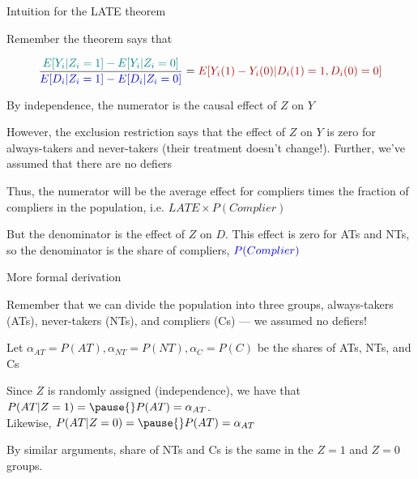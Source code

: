 \documentclass[11pt,english,handout]{beamer}
\newenvironment{wideitemize}{\itemize\addtolength{\itemsep}{10pt}}{\enditemize}
\begin{document}
\begin{frame}{Intuition for the LATE theorem}
\begin{wideitemize}
	\item
	Remember the theorem says that 
	
	$$ \dfrac{ \color{teal} E[Y_i | Z_i = 1] - E[Y_i | Z_i = 0 ]  }{  \color{blue} E[D_i | Z_i = 1] - E[D_i | Z_i = 0 ]   }  = {\color{red} E[Y_i(1) - Y_i(0) | D_i(1) = 1, D_i(0) = 0 ] } $$
	
	\pause
	\item
	By independence, the {\color{teal} numerator} is the causal effect of $Z$ on $Y$
	
	\pause
	\item
	However, the exclusion restriction says that the effect of $Z$ on $Y$ is zero for always-takers and never-takers (their treatment doesn't change!). \pause Further, we've assumed that there are no defiers
	
	\pause
	\item
	Thus,  the {\color{teal} numerator} will be the average effect for compliers times the fraction of compliers in the population, i.e. {\color{teal}  $LATE \times P(Complier)$ } 
	
	\pause
	\item
	But the {\color{blue} denominator} is the effect of $Z$ on $D$. This effect is zero for ATs and NTs, so the denominator is the share of compliers, ${\color{blue}  P(Complier)}$ 
	
\end{wideitemize}	
\end{frame}


\begin{frame}{More formal derivation}

\begin{wideitemize}
	\item
	Remember that we can divide the population into three groups, always-takers (ATs), never-takers (NTs), and compliers (Cs) \pause --- we assumed no defiers!
	
	\item
	Let $\alpha_{AT} = P(AT), \alpha_{NT} = P(NT), \alpha_{C} = P(C)$ be the shares of ATs, NTs, and Cs
	
	\pause
	\item
	Since $Z$ is randomly assigned (independence), we have that 
	$P(AT |  Z = 1) =\pause{} P(AT) = \alpha_{AT}$. \\ \pause
	Likewise, $P(AT |  Z = 0) =\pause{} P(AT) = \alpha_{AT}$
	
	\pause
	\item
	By similar arguments, share of NTs and Cs is the same in the $Z=1$ and $Z = 0$ groups.
\end{wideitemize}	
	
\end{frame}
\end{document}
